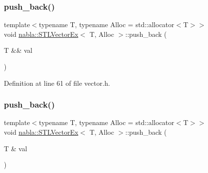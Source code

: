 \mbox{\label{classnabla_1_1_s_t_l_vector_ex_a8fde5302f3fc7dd24a77b24c4acb9ecb}} 
\subsubsection{\texorpdfstring{push\_back()}{push\_back()}\hspace{0.1cm}{\footnotesize\ttfamily [1/2]}}
{\footnotesize\ttfamily template$<$typename T, typename Alloc = std\+::allocator$<$\+T$>$$>$ \\
void \mbox{\hyperlink{classnabla_1_1_s_t_l_vector_ex}{nabla\+::\+S\+T\+L\+Vector\+Ex}}$<$ T, Alloc $>$\+::push\+\_\+back (\begin{DoxyParamCaption}\item[{T \&\&}]{val }\end{DoxyParamCaption})\hspace{0.3cm}{\ttfamily [inline]}}



Definition at line 61 of file vector.\+h.

\mbox{\label{classnabla_1_1_s_t_l_vector_ex_a51ca7d80dcc58e01075f6d1b2eb24f81}} 
\subsubsection{\texorpdfstring{push\_back()}{push\_back()}\hspace{0.1cm}{\footnotesize\ttfamily [2/2]}}
{\footnotesize\ttfamily template$<$typename T, typename Alloc = std\+::allocator$<$\+T$>$$>$ \\
void \mbox{\hyperlink{classnabla_1_1_s_t_l_vector_ex}{nabla\+::\+S\+T\+L\+Vector\+Ex}}$<$ T, Alloc $>$\+::push\+\_\+back (\begin{DoxyParamCaption}\item[{T \&}]{val }\end{DoxyParamCaption})\hspace{0.3cm}{\ttfamily [inline]}}



